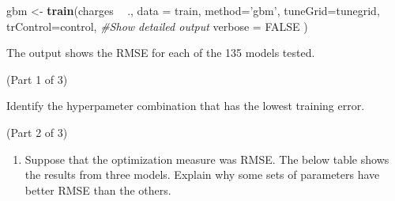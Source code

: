 \documentclass[
  openany]{book}
\newenvironment{Shaded}{\begin{snugshade}}{\end{snugshade}}
\newcommand{\CommentTok}[1]{\textcolor[rgb]{0.56,0.35,0.01}{\textit{#1}}}
\newcommand{\DataTypeTok}[1]{\textcolor[rgb]{0.13,0.29,0.53}{#1}}
\newcommand{\DecValTok}[1]{\textcolor[rgb]{0.00,0.00,0.81}{#1}}
\newcommand{\KeywordTok}[1]{\textcolor[rgb]{0.13,0.29,0.53}{\textbf{#1}}}
\newcommand{\NormalTok}[1]{#1}
\newcommand{\OperatorTok}[1]{\textcolor[rgb]{0.81,0.36,0.00}{\textbf{#1}}}
\newcommand{\OtherTok}[1]{\textcolor[rgb]{0.56,0.35,0.01}{#1}}
\newcommand{\StringTok}[1]{\textcolor[rgb]{0.31,0.60,0.02}{#1}}
\providecommand{\tightlist}{%
  \setlength{\itemsep}{0pt}\setlength{\parskip}{0pt}}
\begin{document}
\begin{Shaded}
\begin{Highlighting}[]
\NormalTok{gbm <-}\StringTok{ }\KeywordTok{train}\NormalTok{(charges }\OperatorTok{~}\StringTok{ }\NormalTok{.,}
            \DataTypeTok{data =}\NormalTok{ train,}
            \DataTypeTok{method=}\StringTok{'gbm'}\NormalTok{, }
            \DataTypeTok{tuneGrid=}\NormalTok{tunegrid, }
            \DataTypeTok{trControl=}\NormalTok{control,}
            \CommentTok{#Show detailed output}
            \DataTypeTok{verbose =} \OtherTok{FALSE}
\NormalTok{            )}
\end{Highlighting}
\end{Shaded}

The output shows the RMSE for each of the 135 models tested.

(Part 1 of 3)

Identify the hyperpameter combination that has the lowest training error.

(Part 2 of 3)

\begin{enumerate}
\def\labelenumi{\arabic{enumi}.}
\setcounter{enumi}{1}
\tightlist
\item
  Suppose that the optimization measure was RMSE. The below table shows the results from three models. Explain why some sets of parameters have better RMSE than the others.
\end{enumerate}

\begin{Shaded}
\end{Shaded}
\end{document}

